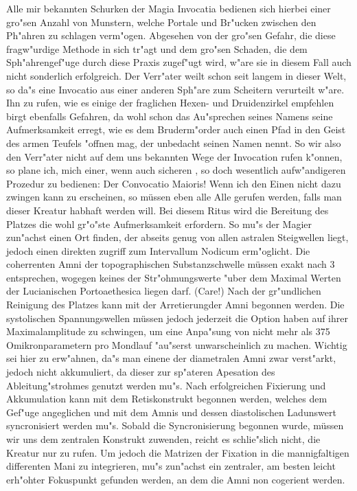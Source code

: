 \documentclass[a5paper,8pt]{book}
\begin{document}
\vspace{10mm}

Alle mir bekannten Schurken der Magia Invocatia bedienen sich hierbei einer gro"sen Anzahl von Munstern, welche Portale und Br"ucken zwischen den Ph"ahren zu schlagen verm"ogen. Abgesehen von der gro"sen Gefahr, die diese fragw"urdige Methode in sich tr"agt und dem gro"sen Schaden, die dem Sph"ahrengef"uge durch diese Praxis zugef"ugt wird, w"are sie in diesem Fall auch nicht sonderlich erfolgreich. Der Verr"ater weilt schon seit langem in dieser Welt, so da"s eine Invocatio aus einer anderen Sph"are zum Scheitern verurteilt w"are.
Ihn zu rufen, wie es einige der fraglichen Hexen- und Druidenzirkel empfehlen birgt ebenfalls Gefahren, da wohl schon das Au"sprechen seines Namens seine Aufmerksamkeit erregt, wie es dem Bruderm"order auch einen Pfad in den Geist des armen Teufels "offnen mag, der unbedacht seinen Namen nennt.
So wir also den Verr"ater nicht auf dem uns bekannten Wege der Invocation rufen k"onnen, so plane ich, mich einer, wenn auch sicheren , so doch wesentlich aufw"andigeren Prozedur zu bedienen:
Der Convocatio Maioris!
Wenn ich den Einen nicht dazu zwingen kann zu erscheinen, so müssen eben alle Alle gerufen werden, falls man dieser Kreatur habhaft werden will.
Bei diesem Ritus wird die Bereitung des Platzes die wohl gr"o"ste Aufmerksamkeit erfordern. So mu"s der Magier zun"achst einen Ort finden, der abseits genug von allen astralen Steigwellen liegt, jedoch einen direkten zugriff zum Intervallum Nodicum erm"oglicht. Die coherrenten Amni der topographischen Substanzschwelle müssen exakt nach 3 entsprechen, wogegen keines der Str"ohmungswerte "uber dem Maximal Werten der Lucianischen Portoaethesica liegen darf. (Care!)
Nach der gr"undlichen Reinigung des Platzes kann mit der Arretierungder Amni begonnen werden.
Die systolischen Spannungswellen müssen jedoch jederzeit die Option haben auf ihrer Maximalamplitude zu schwingen, um eine Anpa"sung von nicht mehr als 375 Omikronparametern pro Mondlauf "au"serst unwarscheinlich zu machen.
Wichtig sei hier zu erw"ahnen, da"s man einene der diametralen Amni zwar verst"arkt, jedoch nicht akkumuliert, da dieser zur sp"ateren Apesation des Ableitung"strohmes genutzt werden mu"s. Nach erfolgreichen Fixierung und Akkumulation kann mit dem Retiskonstrukt begonnen werden, welches dem Gef"uge angeglichen und mit dem Amnis und dessen diastolischen Ladunswert syncronisiert werden mu"s.
Sobald die Syncronisierung begonnen wurde, müssen wir uns dem zentralen Konstrukt zuwenden, reicht es schlie"slich nicht, die Kreatur nur zu rufen. Um jedoch die Matrizen der Fixation in die mannigfaltigen differenten Mani zu integrieren, mu"s zun"achst ein zentraler, am besten leicht erh"ohter Fokuspunkt gefunden werden, an dem die Amni non cogerient werden.
\end{document}
